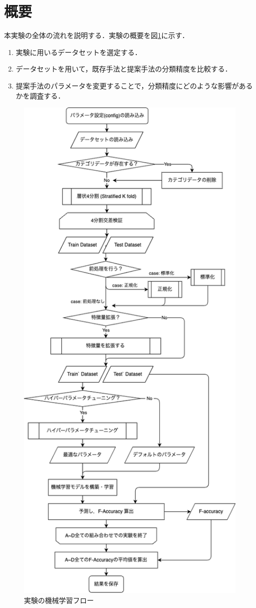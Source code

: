 \section{概要}
本実験の全体の流れを説明する．実験の概要を図\ref{fig:ml-flow}に示す．

\begin{enumerate}
  \item 実験に用いるデータセットを選定する．
  \item データセットを用いて，既存手法と提案手法の分類精度を比較する．
  \item 提案手法のパラメータを変更することで，分類精度にどのような影響があるかを調査する．
\end{enumerate}

\begin{figure}[htbp]  
  \centering
  \includegraphics[width=0.6\linewidth\centering]{figures/ml-flow.png}
  \caption{実験の機械学習フロー}
  \label{fig:ml-flow}
\end{figure}
